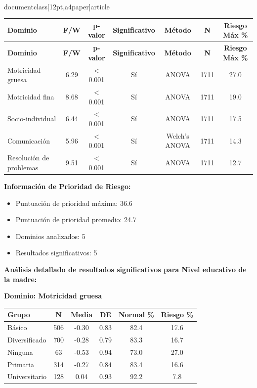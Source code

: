 \\documentclass[12pt,a4paper]{article}
\begin{document}
\begin{longtable}{|l|c|c|c|c|c|c|}
\hline
\textbf{Dominio} & \textbf{F/W} & \textbf{p-valor} & \textbf{Significativo} & \textbf{Método} & \textbf{N} & \textbf{Riesgo Máx \%} \\
\hline
\endfirsthead

\hline
\textbf{Dominio} & \textbf{F/W} & \textbf{p-valor} & \textbf{Significativo} & \textbf{Método} & \textbf{N} & \textbf{Riesgo Máx \%} \\
\hline
\endhead

\hline
\endfoot

\hline
\endlastfoot

Motricidad gruesa & 6.29 & < 0.001 & Sí & ANOVA & 1711 & 27.0 \\
Motricidad fina & 8.68 & < 0.001 & Sí & ANOVA & 1711 & 19.0 \\
Socio-individual & 6.44 & < 0.001 & Sí & ANOVA & 1711 & 17.5 \\
Comunicación & 5.96 & < 0.001 & Sí & Welch's ANOVA & 1711 & 14.3 \\
Resolución de problemas & 9.51 & < 0.001 & Sí & ANOVA & 1711 & 12.7 \\

\end{longtable}


\textbf{Información de Prioridad de Riesgo:}
\begin{itemize}
\item Puntuación de prioridad máxima: 36.6
\item Puntuación de prioridad promedio: 24.7
\item Dominios analizados: 5
\item Resultados significativos: 5
\end{itemize}


\textbf{Análisis detallado de resultados significativos para Nivel educativo de la madre:}


\textbf{Dominio: Motricidad gruesa}


\begin{center}
\begin{tabular}{|l|c|c|c|c|c|}
\hline
\textbf{Grupo} & \textbf{N} & \textbf{Media} & \textbf{DE} & \textbf{Normal \%} & \textbf{Riesgo \%} \\
\hline
Básico & 506 & -0.30 & 0.83 & 82.4 & 17.6 \\
Diversificado & 700 & -0.28 & 0.79 & 83.3 & 16.7 \\
Ninguna & 63 & -0.53 & 0.94 & 73.0 & 27.0 \\
Primaria & 314 & -0.27 & 0.84 & 83.4 & 16.6 \\
Universitario & 128 & 0.04 & 0.93 & 92.2 & 7.8 \\

\hline
\end{tabular}
\end{center}
\end{document}
